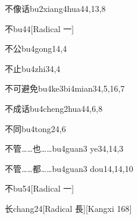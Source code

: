 \begin{verbete}{不像话}{bu2xiang4hua4}{4,13,8}
\end{verbete}

\begin{verbete}{不}{bu4}{4}[Radical 一]
\end{verbete}

\begin{verbete}{不公}{bu4gong1}{4,4}
\end{verbete}

\begin{verbete}{不止}{bu4zhi3}{4,4}
\end{verbete}

\begin{verbete}{不可避免}{bu4ke3bi4mian3}{4,5,16,7}
\end{verbete}

\begin{verbete}{不成话}{bu4cheng2hua4}{4,6,8}
\end{verbete}

\begin{verbete}{不同}{bu4tong2}{4,6}
\end{verbete}

\begin{verbete}{不管……也……}{bu4guan3 ye3}{4,14,3}
\end{verbete}

\begin{verbete}{不管……都……}{bu4guan3 dou1}{4,14,10}
\end{verbete}

\begin{verbete}{不}{bu5}{4}[Radical 一]
\end{verbete}

\begin{verbete}{长}{chang2}{4}[Radical 長][Kangxi 168]
\end{verbete}

